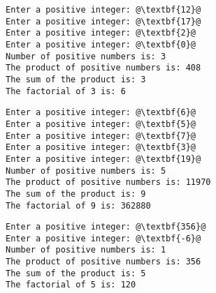 \documentclass[12pt]{article}
\begin{document}
\begin{center}
\begin{minipage}{7cm}
\begin{lstlisting}[escapechar=@]
Enter a positive integer: @\textbf{12}@
Enter a positive integer: @\textbf{17}@
Enter a positive integer: @\textbf{2}@
Enter a positive integer: @\textbf{0}@
Number of positive numbers is: 3
The product of positive numbers is: 408
The sum of the product is: 3
The factorial of 3 is: 6
\end{lstlisting}
\end{minipage}
\hspace*{0.5cm}
\begin{minipage}{7cm}
\begin{lstlisting}[escapechar=@]
Enter a positive integer: @\textbf{6}@
Enter a positive integer: @\textbf{5}@
Enter a positive integer: @\textbf{7}@
Enter a positive integer: @\textbf{3}@
Enter a positive integer: @\textbf{19}@
Number of positive numbers is: 5
The product of positive numbers is: 11970
The sum of the product is: 9
The factorial of 9 is: 362880
\end{lstlisting}
\end{minipage}
\begin{minipage}{7cm}
\begin{lstlisting}[escapechar=@]
Enter a positive integer: @\textbf{356}@
Enter a positive integer: @\textbf{-6}@
Number of positive numbers is: 1
The product of positive numbers is: 356
The sum of the product is: 5
The factorial of 5 is: 120
\end{lstlisting}
\end{minipage}
\end{center}
\end{document}
